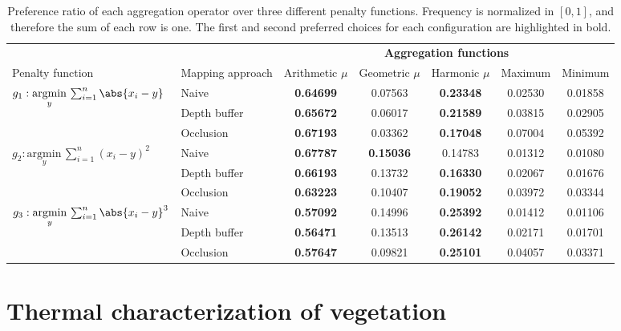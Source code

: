 \renewcommand{\arraystretch}{1.2}
\begin{table}
    \footnotesize
    \centering
    \caption{Preference ratio of each aggregation operator over three different penalty functions. Frequency is normalized in $[0, 1]$, and therefore the sum of each row is one. The first and second preferred choices for each configuration are highlighted in bold. }
    \label{table:thermal_aggregation_frequency}
    \begin{tabular}{@{}llccccc@{} }
    \toprule
    & & \multicolumn{5}{c}{\textbf{Aggregation functions}} \\
    \cmidrule{3-7}
    Penalty function & Mapping approach & Arithmetic $\mu$ & Geometric $\mu$ & Harmonic $\mu$ & Maximum & Minimum\\
    \midrule
    \multirow{2}{*}{$g_1 : \underset{y}{\mathrm{argmin}}\, \sum_{i=1}^{n} \abs{x_i - y}$} & Naive & \textbf{0.64699} & 0.07563 & \textbf{0.23348} & 0.02530 & 0.01858 \\
    & Depth buffer & \textbf{0.65672} & 0.06017 & \textbf{0.21589} & 0.03815 & 0.02905 \\
    & Occlusion & \textbf{0.67193} & 0.03362 & \textbf{0.17048} & 0.07004 & 0.05392 \\
    \multirow{2}{*}{$g_2 : \underset{y}{\mathrm{argmin}}\, \sum_{i=1}^{n} (x_i - y)^2$} & Naive & \textbf{0.67787} & \textbf{0.15036} & 0.14783 & 0.01312 & 0.01080 \\
    & Depth buffer & \textbf{0.66193} & 0.13732 & \textbf{0.16330} & 0.02067 & 0.01676 \\
    & Occlusion & \textbf{0.63223} & 0.10407 & \textbf{0.19052} & 0.03972 & 0.03344 \\
    \multirow{2}{*}{$g_3 : \underset{y}{\mathrm{argmin}}\, \sum_{i=1}^{n} \abs{x_i - y}^3$} & Naive & \textbf{0.57092} & 0.14996 & \textbf{0.25392} & 0.01412 & 0.01106 \\
    & Depth buffer & \textbf{0.56471} & 0.13513 & \textbf{0.26142} & 0.02171 & 0.01701 \\
    & Occlusion & \textbf{0.57647} & 0.09821 & \textbf{0.25101} & 0.04057 & 0.03371 \\
    \bottomrule
    \end{tabular}
    \normalsize
\end{table}
\renewcommand{\arraystretch}{1}

\section{Thermal characterization of vegetation}

